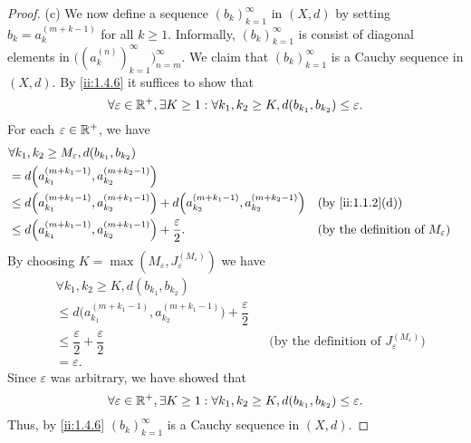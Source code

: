 \begin{proof}{(c)}
  We now define a sequence \((b_k)_{k = 1}^\infty\) in \((X, d)\) by setting \(b_k = a_k^{(m + k - 1)}\) for all \(k \geq 1\).
  Informally, \((b_k)_{k = 1}^\infty\) is consist of diagonal elements in \(\big((a_k^{(n)})_{k = 1}^\infty\big)_{n = m}^\infty\).
  We claim that \((b_k)_{k = 1}^\infty\) is a Cauchy sequence in \((X, d)\).
  By \cref{ii:1.4.6} it suffices to show that
  \[
    \forall \varepsilon \in \mathbb{R}^+, \exists K \geq 1 : \forall k_1, k_2 \geq K, d(b_{k_1}, b_{k_2}) \leq \varepsilon.
  \]
  For each \(\varepsilon \in \mathbb{R}^+\), we have
  \begin{align*}
     & \forall k_1, k_2 \geq M_\varepsilon, d(b_{k_1}, b_{k_2})                                                                                                                            \\
     & = d\Big(a_{k_1}^{(m + k_1 - 1)}, a_{k_2}^{(m + k_2 - 1)}\Big)                                                                                                                       \\
     & \leq d\Big(a_{k_1}^{(m + k_1 - 1)}, a_{k_2}^{(m + k_1 - 1)}\Big) + d\Big(a_{k_2}^{(m + k_1 - 1)}, a_{k_2}^{(m + k_2 - 1)}\Big) &  & \by{ii:1.1.2}[d]                                \\
     & \leq d\Big(a_{k_1}^{(m + k_1 - 1)}, a_{k_2}^{(m + k_1 - 1)}\Big) + \dfrac{\varepsilon}{2}.                                     &  & \text{(by the definition of \(M_\varepsilon\))}
  \end{align*}
  By choosing \(K = \max(M_\varepsilon, J_\varepsilon^{(M_\varepsilon)})\) we have
  \begin{align*}
     & \forall k_1, k_2 \geq K, d(b_{k_1}, b_{k_2})                                                                                                                     \\
     & \leq d\Big(a_{k_1}^{(m + k_1 - 1)}, a_{k_2}^{(m + k_1 - 1)}\Big) + \dfrac{\varepsilon}{2}                                                                        \\
     & \leq \dfrac{\varepsilon}{2} + \dfrac{\varepsilon}{2}                                      &  & \text{(by the definition of \(J_\varepsilon^{(M_\varepsilon)}\))} \\
     & = \varepsilon.
  \end{align*}
  Since \(\varepsilon\) was arbitrary, we have showed that
  \[
    \forall \varepsilon \in \mathbb{R}^+, \exists K \geq 1 : \forall k_1, k_2 \geq K, d(b_{k_1}, b_{k_2}) \leq \varepsilon.
  \]
  Thus, by \cref{ii:1.4.6} \((b_k)_{k = 1}^\infty\) is a Cauchy sequence in \((X, d)\).


\end{proof}
